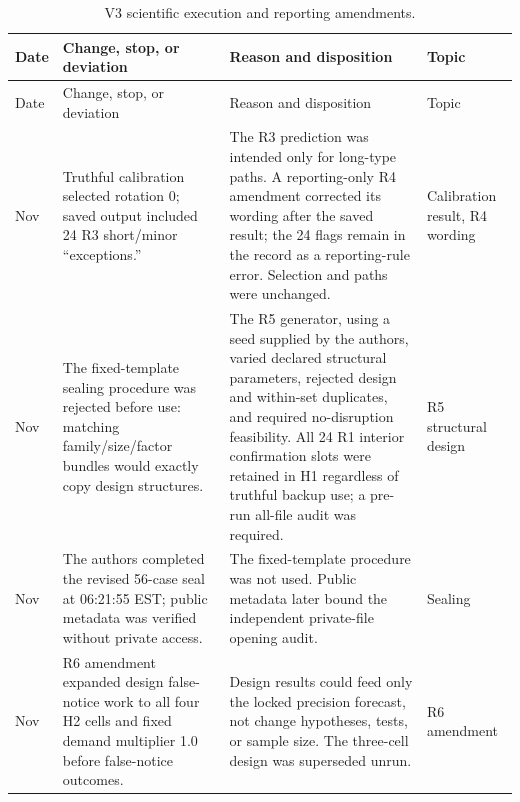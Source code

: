 \documentclass[preprint,11pt,authoryear]{elsarticle}
\begin{document}
\begingroup\small\setlength{\tabcolsep}{4pt}\renewcommand{\arraystretch}{1.18}
\renewcommand{\thetable}{C4}
\begin{longtable}{>{\raggedright\arraybackslash}p{1.1cm}>{\raggedright\arraybackslash}p{4.6cm}>{\raggedright\arraybackslash}p{6.2cm}>{\raggedright\arraybackslash}p{2.7cm}}
\caption{V3 scientific execution and reporting amendments.}\label{tab:deviations4}\\
\toprule
Date & Change, stop, or deviation & Reason and disposition & Topic \\
\midrule
\endfirsthead
Date & Change, stop, or deviation & Reason and disposition & Topic \\
\midrule
\endhead
\bottomrule\endfoot
13 Nov & Truthful calibration selected rotation 0; saved output included 24 R3 short/minor ``exceptions.'' & The R3 prediction was intended only for long-type paths. A reporting-only R4 amendment corrected its wording after the saved result; the 24 flags remain in the record as a reporting-rule error. Selection and paths were unchanged. & Calibration result, R4 wording \\
13 Nov & The fixed-template sealing procedure was rejected before use: matching family/size/factor bundles would exactly copy design structures. & The R5 generator, using a seed supplied by the authors, varied declared structural parameters, rejected design and within-set duplicates, and required no-disruption feasibility. All 24 R1 interior confirmation slots were retained in H1 regardless of truthful backup use; a pre-run all-file audit was required. & R5 structural design \\
13 Nov & The authors completed the revised 56-case seal at 06:21:55 EST; public metadata was verified without private access. & The fixed-template procedure was not used. Public metadata later bound the independent private-file opening audit. & Sealing \\
13 Nov & R6 amendment expanded design false-notice work to all four H2 cells and fixed demand multiplier 1.0 before false-notice outcomes. & Design results could feed only the locked precision forecast, not change hypotheses, tests, or sample size. The three-cell design was superseded unrun. & R6 amendment \\

\end{longtable}
\end{document}
